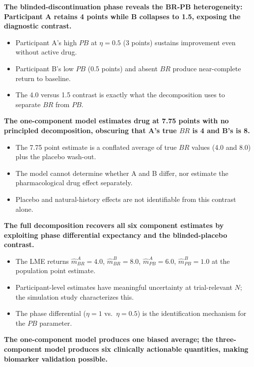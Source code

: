 \documentclass[
  11pt,
]{article}
\begin{document}
\textbf{The blinded-discontinuation phase reveals the BR-PB heterogeneity: Participant A retains 4 points while B collapses to 1.5, exposing the diagnostic contrast.}

\begin{itemize}\setlength{\itemsep}{2pt}\setlength{\parskip}{0pt}
\item Participant A's high $PB$ at $\eta = 0.5$ (3 points) sustains improvement even without active drug.
\item Participant B's low $PB$ (0.5 points) and absent $BR$ produce near-complete return to baseline.
\item The 4.0 versus 1.5 contrast is exactly what the decomposition uses to separate $BR$ from $PB$.
\end{itemize}

\textbf{The one-component model estimates drug at 7.75 points with no principled decomposition, obscuring that A's true $BR$ is 4 and B's is 8.}

\begin{itemize}\setlength{\itemsep}{2pt}\setlength{\parskip}{0pt}
\item The 7.75 point estimate is a conflated average of true $BR$ values (4.0 and 8.0) plus the placebo wash-out.
\item The model cannot determine whether A and B differ, nor estimate the pharmacological drug effect separately.
\item Placebo and natural-history effects are not identifiable from this contrast alone.
\end{itemize}

\textbf{The full decomposition recovers all six component estimates by exploiting phase differential expectancy and the blinded-placebo contrast.}

\begin{itemize}\setlength{\itemsep}{2pt}\setlength{\parskip}{0pt}
\item The LME returns $\hat{m}_{BR}^A = 4.0$, $\hat{m}_{BR}^B = 8.0$, $\hat{m}_{PB}^A = 6.0$, $\hat{m}_{PB}^B = 1.0$ at the population point estimate.
\item Participant-level estimates have meaningful uncertainty at trial-relevant $N$; the simulation study characterizes this.
\item The phase differential ($\eta = 1$ vs.\ $\eta = 0.5$) is the identification mechanism for the $PB$ parameter.
\end{itemize}

\textbf{The one-component model produces one biased average; the three-component model produces six clinically actionable quantities, making biomarker validation possible.}
\end{document}
